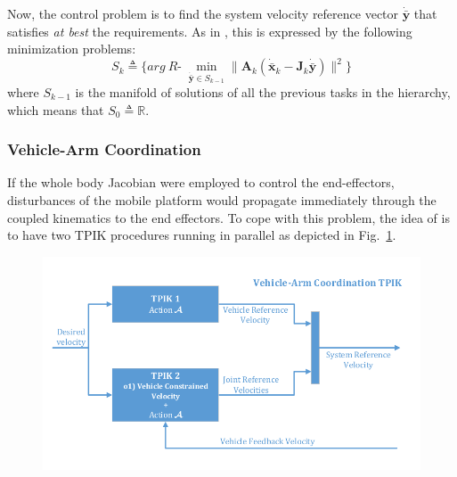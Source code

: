 \documentclass[a4paper, 12pt, notitlepage]{article}
\begin{document}
\begin{multicols}{2}
		Now, the control problem is to find the system velocity reference vector $\dot{\bar{\boldsymbol{y}}}$ that satisfies \textit{at best} the requirements. As in \cite{coopcasa}, this is expressed by the following minimization problems:
		\begin{equation}
			S_k \triangleq \Big\{ arg\:R\mbox{-} \; \min\limits_{\dot{\bar{\boldsymbol{y}}} \in S_{k-1}} \big\| \boldsymbol{A}_k (\dot{\bar{\boldsymbol{x}}}_k - \boldsymbol{J}_k \dot{\bar{\boldsymbol{y}}}) \big\|^2 \Big\}
		\end{equation}
		where $S_{k-1}$ is the manifold of solutions of all the previous
		tasks in the hierarchy, which means that $S_0 \triangleq \mathbb{R}$.
		
		\subsubsection{Vehicle-Arm Coordination}\label{subsubsec:vehArmcoord}
		\hspace{7px} If the whole body Jacobian were employed to control the end-effectors, disturbances of the mobile platform would propagate immediately through the coupled kinematics to the end effectors.
		To cope with this problem, the idea of \cite{coopcasa} is to have two TPIK procedures running in parallel as depicted in Fig.\ \ref{fig:veharmcoord}.
		
		\hspace{-30px}
		\begin{figure}[H]
			\centering
			\includegraphics[scale=0.3]{veharmcoord}
			\label{fig:veharmcoord}
		\end{figure}
			

\end{multicols}
\end{document}
